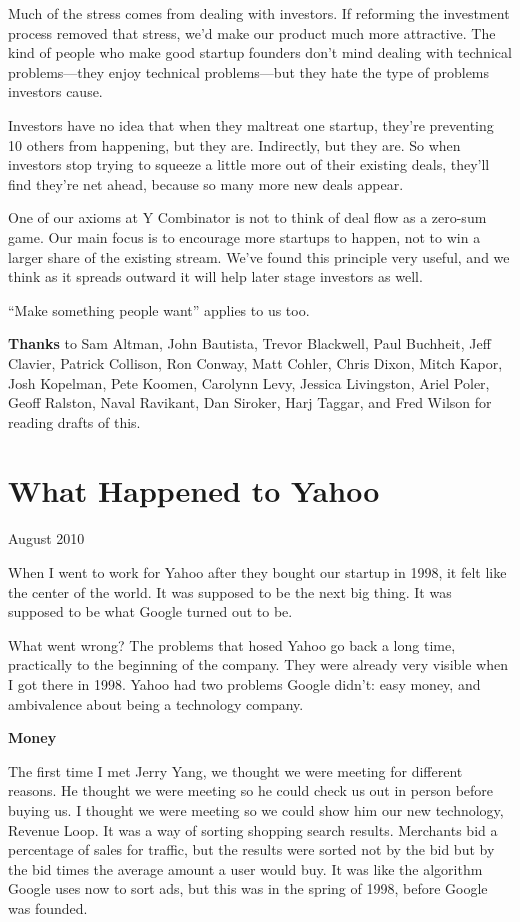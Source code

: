 \documentclass[12pt]{book}
\begin{document}
Much of the stress comes from dealing with investors. If reforming the
investment process removed that stress, we'd make our product much more
attractive. The kind of people who make good startup founders don't mind
dealing with technical problems---they enjoy technical problems---but
they hate the type of problems investors cause.

Investors have no idea that when they maltreat one startup, they're
preventing 10 others from happening, but they are. Indirectly, but they
are. So when investors stop trying to squeeze a little more out of their
existing deals, they'll find they're net ahead, because so many more new
deals appear.

One of our axioms at Y Combinator is not to think of deal flow as a
zero-sum game. Our main focus is to encourage more startups to happen,
not to win a larger share of the existing stream. We've found this
principle very useful, and we think as it spreads outward it will help
later stage investors as well.

``Make something people want'' applies to us too.


\textbf{Thanks} to Sam Altman, John Bautista, Trevor Blackwell, Paul
Buchheit, Jeff Clavier, Patrick Collison, Ron Conway, Matt Cohler, Chris
Dixon, Mitch Kapor, Josh Kopelman, Pete Koomen, Carolynn Levy, Jessica
Livingston, Ariel Poler, Geoff Ralston, Naval Ravikant, Dan Siroker,
Harj Taggar, and Fred Wilson for reading drafts of this.
\chapter{What Happened to Yahoo }

August 2010

When I went to work for Yahoo after they bought our startup in 1998, it
felt like the center of the world. It was supposed to be the next big
thing. It was supposed to be what Google turned out to be.

What went wrong? The problems that hosed Yahoo go back a long time,
practically to the beginning of the company. They were already very
visible when I got there in 1998. Yahoo had two problems Google didn't:
easy money, and ambivalence about being a technology company.

\textbf{Money}

The first time I met Jerry Yang, we thought we were meeting for
different reasons. He thought we were meeting so he could check us out
in person before buying us. I thought we were meeting so we could show
him our new technology, Revenue Loop. It was a way of sorting shopping
search results. Merchants bid a percentage of sales for traffic, but the
results were sorted not by the bid but by the bid times the average
amount a user would buy. It was like the algorithm Google uses now to
sort ads, but this was in the spring of 1998, before Google was founded.
\end{document}
